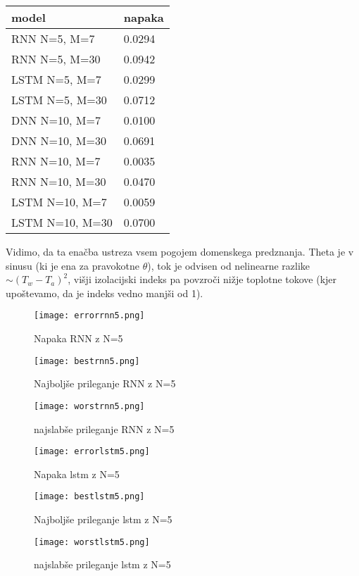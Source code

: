 \documentclass{article}
\begin{document}
\begin{table}[]
    \begin{tabular}{@{}ll@{}}
    \toprule
    model           & napaka \\ \midrule
    RNN N=5, M=7    & 0.0294 \\
    RNN N=5, M=30   & 0.0942 \\
    LSTM N=5, M=7   & 0.0299 \\
    LSTM N=5, M=30  & 0.0712 \\
    DNN N=10, M=7   & 0.0100 \\
    DNN N=10, M=30  & 0.0691 \\
    RNN N=10, M=7   & 0.0035 \\
    RNN N=10, M=30  & 0.0470 \\
    LSTM N=10, M=7  & 0.0059 \\
    LSTM N=10, M=30 & 0.0700
    \end{tabular}
\end{table}

Vidimo, da ta enačba ustreza vsem pogojem domenskega predznanja. Theta je v sinusu (ki je ena za pravokotne \(\theta\)), tok je odvisen od nelinearne razlike \(\sim (T_w-T_a)^2\), višji izolacijski indeks pa povzroči nižje toplotne tokove (kjer upoštevamo, da je indeks vedno manjši od 1).

\begin{figure}[htb]
    \texttt{[image: errorrnn5.png]}
    \caption{Napaka RNN z N=5}
\end{figure}
\begin{figure}[htb]
    \texttt{[image: bestrnn5.png]}
    \caption{Najboljše prileganje RNN z N=5}
\end{figure}
\begin{figure}[htb]
    \texttt{[image: worstrnn5.png]}
    \caption{najslabše prileganje RNN z N=5}
\end{figure}

\begin{figure}[htb]
    \texttt{[image: errorlstm5.png]}
    \caption{Napaka lstm z N=5}
\end{figure}
\begin{figure}[htb]
    \texttt{[image: bestlstm5.png]}
    \caption{Najboljše prileganje lstm z N=5}
\end{figure}
\begin{figure}[htb]
    \texttt{[image: worstlstm5.png]}
    \caption{najslabše prileganje lstm z N=5}
\end{figure}
\end{document}
